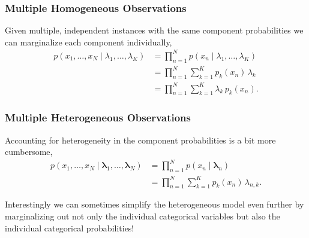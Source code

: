 \documentclass[
  letterpaper,
  DIV=11,
  numbers=noendperiod]{scrartcl}
\begin{document}
\subsubsection{Multiple Homogeneous
Observations}\label{multiple-homogeneous-observations}

Given multiple, independent instances with the same component
probabilities we can marginalize each component individually,
\begin{align*}
p(x_{1}, \ldots, x_{N} \mid \lambda_{1}, \ldots, \lambda_{K})
&=
\prod_{n = 1}^{N} p(x_{n} \mid \lambda_{1}, \ldots, \lambda_{K})
\\
&=
\prod_{n = 1}^{N} \sum_{k = 1}^{K} p_{k}(x_{n}) \, \lambda_{k}
\\
&=
\prod_{n = 1}^{N} \sum_{k = 1}^{K} \lambda_{k} \, p_{k}(x_{n}).
\end{align*}

\subsubsection{Multiple Heterogeneous
Observations}\label{multiple-heterogeneous-observations}

Accounting for heterogeneity in the component probabilities is a bit
more cumbersome, \begin{align*}
p(x_{1}, \ldots, x_{N} \mid
  \boldsymbol{\lambda}_{1}, \ldots, \boldsymbol{\lambda}_{N})
&=
\prod_{n = 1}^{N} p(x_{n} \mid \boldsymbol{\lambda}_{n})
\\
&=
\prod_{n = 1}^{N} \sum_{k = 1}^{K} p_{k}(x_{n}) \, \lambda_{n, k}.
\end{align*}

Interestingly we can sometimes simplify the heterogeneous model even
further by marginalizing out not only the individual categorical
variables but also the individual categorical probabilities!
\end{document}
